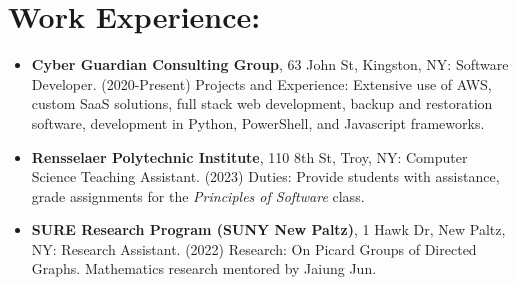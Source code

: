 \section*{Work Experience:}
\begin{itemize}
    \itemsep0em 
    \item \textbf{Cyber Guardian Consulting Group}, 63 John St, Kingston, NY: Software Developer. 
        (2020-Present) Projects and Experience: Extensive use of AWS, custom SaaS solutions, 
        full stack web development, backup and restoration software, development in Python, PowerShell, 
        and Javascript frameworks.
    \item \textbf{Rensselaer Polytechnic Institute}, 110 8th St, Troy, NY: Computer Science Teaching Assistant. 
        (2023) Duties: Provide students with assistance, grade assignments for the \textit{Principles of Software} class.
    \item \textbf{SURE Research Program (SUNY New Paltz)}, 1 Hawk Dr, New Paltz, NY: Research Assistant. 
        (2022) Research: On Picard Groups of Directed Graphs. Mathematics research mentored by Jaiung Jun.
\end{itemize}